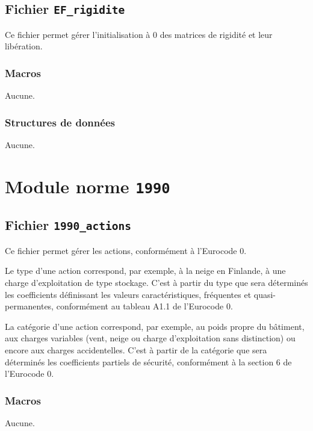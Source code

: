 \documentclass{article}
\begin{document}
\subsection{Fichier {\texttt{EF\_rigidite}}}
Ce fichier permet gérer l'initialisation à 0 des matrices de rigidité et leur libération.
\subsubsection{Macros}
Aucune.
\subsubsection{Structures de données}
Aucune.




\section{Module norme {\texttt{1990}}}
\subsection{Fichier {\texttt{1990\_actions}}}
Ce fichier permet gérer les actions, conformément à l'Eurocode 0.\par
Le type d'une action correspond, par exemple, à la neige en Finlande, à une charge d'exploitation de type stockage. C'est à partir du type que sera déterminés les coefficients définissant les valeurs caractéristiques, fréquentes et quasi-permanentes, conformément au tableau A1.1 de l'Eurocode 0.\par
La catégorie d'une action correspond, par exemple, au poids propre du bâtiment, aux charges variables (vent, neige ou charge d'exploitation sans distinction) ou encore aux charges accidentelles. C'est à partir de la catégorie que sera déterminés les coefficients partiels de sécurité, conformément à la section 6 de l'Eurocode 0.
\subsubsection{Macros}
Aucune.
\end{document}
